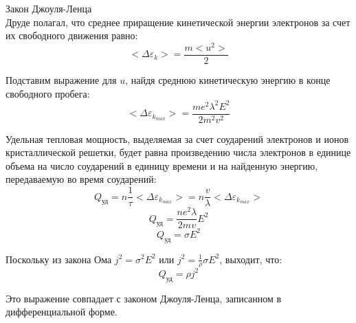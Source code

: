 \documentclass{article}
\begin{document}
	Закон Джоуля-Ленца\\

	Друде полагал, что среднее приращение кинетической энергии электронов за счет их свободного движения равно:
	\begin{equation}
		<\Delta\varepsilon_k> = \frac{m<u^2>}{2}
	\end{equation}

	Подставим выражение для $u$, найдя среднюю кинетическую энергию в конце свободного пробега:
	\begin{equation}
		<\Delta\varepsilon_{k_{max}}> = \frac{me^2\lambda^2E^2}{2m^2v^2}
	\end{equation}

	Удельная тепловая мощность, выделяемая за счет соударений электронов и ионов кристаллической решетки, будет равна произведению числа электронов в единице объема на число соударений в единицу времени и на найденную энергию, передаваемую во время соударений:
	\begin{equation}
		Q_{\text{уд}} = n\frac{1}{\tau}<\Delta\varepsilon_{k_{max}}> = n\frac{v}{\lambda}<\Delta\varepsilon_{k_{max}}>
	\end{equation}
	\begin{equation}
		Q_{\text{уд}} = \frac{ne^2\lambda}{2mv}E^2
	\end{equation}
	\begin{equation}
		Q_{\text{уд}} = \sigma E^2
	\end{equation}

	Поскольку из закона Ома $j^2 = \sigma^2 E^2$ или $j^2 = \frac{1}{\rho}\sigma E^2$, выходит, что:
	\begin{equation}
		Q_{\text{уд}} = \rho j^2
	\end{equation}

	Это выражение совпадает с законом Джоуля-Ленца, записанном в дифференциальной форме.
\end{document}
